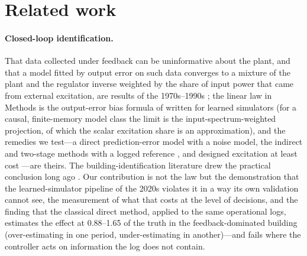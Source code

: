 \documentclass[11pt]{article}
\begin{document}
\section*{Related work}
\paragraph{Closed-loop identification.} That data collected under feedback can be uninformative about the plant, and that a model fitted by output error on such data converges to a mixture of the plant and the regulator inverse weighted by the share of input power that came from external excitation, are results of the 1970s--1990s \citep{gustavsson1977,soderstrom1989,ljung1999,forssell1999}; the linear law in Methods is the output-error bias formula of \citet{forssell1999} written for learned simulators (for a causal, finite-memory model class the limit is the input-spectrum-weighted projection, of which the scalar excitation share is an approximation), and the remedies we test---a direct prediction-error model with a noise model, the indirect and two-stage methods with a logged reference \citep{vandenhof1993}, and designed excitation at least cost \citep{bombois2006,hjalmarsson2005}---are theirs. The building-identification literature drew the practical conclusion long ago \citep{bacher2011,privara2013}. Our contribution is not the law but the demonstration that the learned-simulator pipeline of the 2020s violates it in a way its own validation cannot see, the measurement of what that costs at the level of decisions, and the finding that the classical direct method, applied to the same operational logs, estimates the effect at 0.88--1.65 of the truth in the feedback-dominated building (over-estimating in one period, under-estimating in another)---and fails where the controller acts on information the log does not contain.
\end{document}
